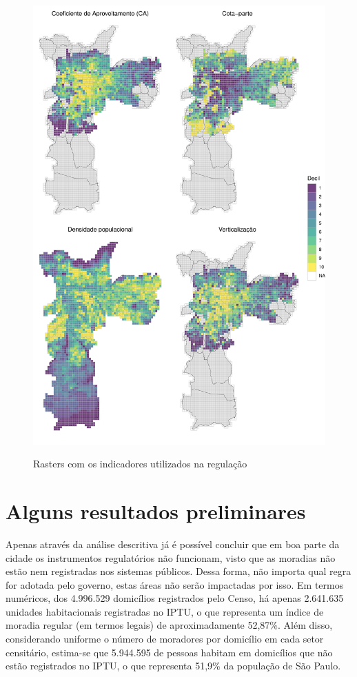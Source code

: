 \begin{figure}[h]
    \centering
    \caption{Rasters com os indicadores utilizados na regulação}
    \includegraphics[width = \linewidth]{imagens/rasters.pdf}
    \label{fig:rasters}
\end{figure}

\section*{Alguns resultados preliminares}

Apenas através da análise descritiva já é possível concluir que em boa parte da cidade os instrumentos regulatórios não funcionam, visto que as moradias não estão nem registradas nos sistemas públicos. Dessa forma, não importa qual regra for adotada pelo governo, estas áreas não serão impactadas por isso. Em termos numéricos, dos 4.996.529 domicílios registrados pelo Censo, há apenas 2.641.635 unidades habitacionais registradas no IPTU, o que representa um índice de moradia regular (em termos legais) de aproximadamente 52,87\%. Além disso, considerando uniforme o número de moradores por domicílio em cada setor censitário, estima-se que 5.944.595 de pessoas habitam em domicílios que não estão registrados no IPTU, o que representa 51,9\% da população de São Paulo.

